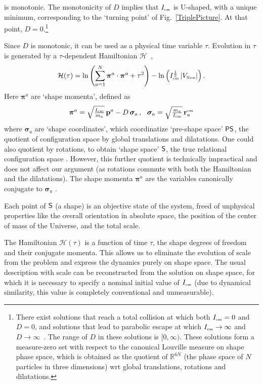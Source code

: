 \documentclass[prl,nofootinbib,twocolumn,superscriptaddress]{revtex4}
\newcommand{\st}[1]{\text{\tiny \rm #1}}
\def\shs{{\sf S}}
\def\pshs{{\sf PS}}
\begin{document}
is monotonic. The monotonicity of $D$ implies that $I_\st{cm}$ is U-shaped, with a unique minimum,
corresponding to the `turning point' of Fig.~\ref{TriplePicture}. At that point, $D=0$.\footnote{There exist solutions that reach a total collision at which both $I_\st{cm}=0$ and $D=0$, and solutions that lead to parabolic escape at which $I_\st{cm} \to \infty$ and $D \to \infty$~\cite{chenciner1998collisions}. The range of $D$ in these solutions is $[0,\infty)$. These solutions form a measure-zero set with respect to the canonical Louville measure on shape phase space, which is obtained as the quotient of $\mathbb R^{6N}$ (the phase space of $N$ particles in three dimensions) wrt global translations, rotations and dilatations.\label{zm}}

Since $D$ is monotonic, it can be used as a physical time variable $\tau$. Evolution in $\tau$ is generated by a $\tau$-dependent Hamiltonian $\mathcal H$~\cite{LongPaper},
\begin{equation} \label{TimeDepHamiltonian}
 \mathcal H(\tau)=\ln\left( \sum_{a=1}^N {\bm \pi}^a  \cdot {\bm \pi}^a + \tau^2 \right)
 - \ln \left( I_\st{cm}^{\frac 1 2} \, |V_\st{New}| \right) .
\end{equation}
Here ${\bm \pi}^a$ are `shape momenta', defined as
\begin{equation}
{\bm \pi}^a  = \sqrt{\textstyle \frac{I_\st{cm}}{m_a}} \, {\bf p}^a - D \, {\bm \sigma}_a \,,
~~
{\bm \sigma}_a  = \sqrt{\textstyle \frac{m_a}{I_\st{cm}}} \, {\bf r}_a^\st{cm}
\end{equation}
where ${\bm \sigma}_a$ are `shape coordinates', which coordinatize `pre-shape space' $\pshs$, the quotient of configuration space by global translations and dilatations.
One could also quotient by rotations, to obtain `shape space' $\shs$,
the true relational configuration space \cite{LongPaper,FlaviosSDtutorial}. However,
this further quotient is technically impractical and does not affect our
argument (as rotations commute with both the Hamiltonian and the dilatations).
The shape momenta ${\bm \pi}^a $ are the variables canonically conjugate 
to ${\bm \sigma}_a $ \cite{LongPaper}.

Each point of $\shs$ (a shape) is an objective state of the system, freed of unphysical
properties like the overall orientation in absolute space, the position of the center
of mass of the Universe, and the total scale.

The Hamiltonian $\mathcal H(\tau)$ is a function of time $\tau$, the shape degrees of freedom and their conjugate momenta. This allows us to eliminate the evolution of scale from the problem and express the dynamics purely on shape space. The usual description
with scale can be reconstructed from the solution on shape space, for which it is necessary
to specify a nominal initial value of $I_\st{cm}$ (due to dynamical similarity,
this value is completely conventional and unmeasurable).
\end{document}

